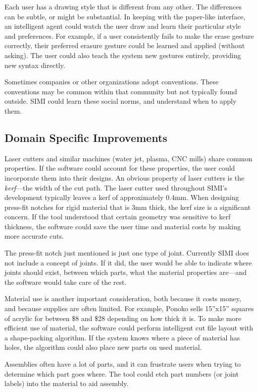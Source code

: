 Each user has a drawing style that is different from any other. The
differences can be subtle, or might be substantial. In keeping with
the paper-like interface, an intelligent agent could watch the user
draw and learn their particular style and preferences. For example, if
a user consistently fails to make the erase gesture correctly, their
preferred erasure gesture could be learned and applied (without
asking). The user could also teach the system new gestures entirely,
providing new syntax directly.

Sometimes companies or other organizations adopt conventions. These
conventions may be common within that community but not typically
found outside. SIMI could learn these social norms, and understand
when to apply them.

\subsection{Domain Specific Improvements}

Laser cutters and similar machines (water jet, plasma, CNC mills)
share common properties. If the software could account for these
properties, the user could incorporate them into their designs. An
obvious property of laser cutters is the \textit{kerf}---the width of
the cut path. The laser cutter used throughout SIMI's development
typically leaves a kerf of approximately 0.4mm. When designing
press-fit notches for rigid material that is 3mm thick, the kerf size
is a significant concern. If the tool understood that certain geometry
was sensitive to kerf thickness, the software could save the user time
and material costs by making more accurate cuts.

The press-fit notch just mentioned is just one type of
joint. Currently SIMI does not include a concept of joints. If it did,
the user would be able to indicate where joints should exist, between
which parts, what the material properties are---and the software would
take care of the rest.

Material use is another important consideration, both because it costs
money, and because supplies are often limited. For example, Ponoko
sells 15''x15'' squares of acrylic for between \$8 and \$28 depending
on how thick it is. To make more efficient use of material, the
software could perform intelligent cut file layout with a shape-packing
algorithm. If the system knows where a piece of material has holes,
the algorithm could also place new parts on used material.

Assemblies often have a lot of parts, and it can frustrate users when
trying to determine which part goes where. The tool could etch part
numbers (or joint labels) into the material to aid assembly.

